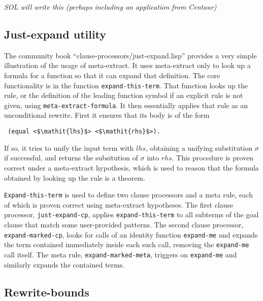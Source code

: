{\it \color{red} SOL will write this (perhaps including an application
  from Centaur)}

\subsection{Just-expand utility}

The community book ``clause-processors/just-expand.lisp'' provides a
very simple illustration of the usage of meta-extract.  It uses
meta-extract only to look up a formula for a function so that it can
expand that definition.  The core functionality is in the function
\texttt{expand-this-term}.  That function looks up the rule, or the
definition of the leading function symbol if an explicit rule is not
given, using \texttt{meta-extract-formula}.  It then essentially
applies that rule as an unconditional rewrite.  First it ensures that
its body is of the form
\begin{lstlisting}
 (equal <$\mathit{lhs}$> <$\mathit{rhs}$>).
\end{lstlisting}
If so, it tries to unify the input term with $\mathit{lhs}$, obtaining
a unifying substitution $\sigma$ if successful, and returns the
subsitution of $\sigma$ into $\mathit{rhs}$.  This procedure is proven
correct under a meta-extract hypothesis, which is used to reason that
the formula obtained by looking up the rule is a theorem.

\texttt{Expand-this-term} is used to define two clause processors and
a meta rule, each of which is proven correct using meta-extract
hypotheses.  The first clause processor, \texttt{just-expand-cp},
applies \texttt{expand-this-term} to all subterms of the goal clause
that match some user-provided patterns.  The second clause processor,
\texttt{expand-marked-cp}, looks for calls of an identity function
\texttt{expand-me} and expands the term contained immediately inside
each such call, removing the \texttt{expand-me} call itself.  The meta
rule, \texttt{expand-marked-meta}, triggers on \texttt{expand-me} and
similarly expands the contained terms.


\subsection{Rewrite-bounds}

